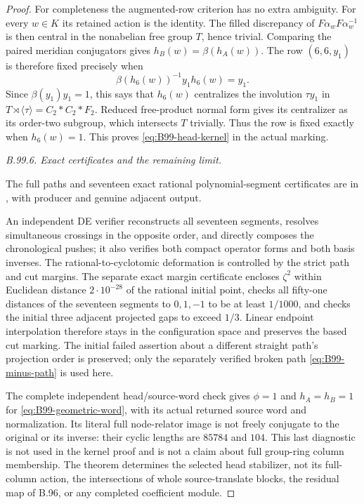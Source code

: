 \begin{proof}
For completeness the augmented-row criterion has no extra ambiguity.
For every $w\in K$ its retained action is the identity.
The filled discrepancy of $F\alpha_wF\alpha_w^{-1}$ is then central
in the nonabelian free group $T$, hence trivial.
Comparing the paired meridian conjugators gives
$h_B(w)=\beta(h_A(w))$.
The row $(6,6,y_1)$ is therefore fixed precisely when
\[
 \beta(h_6(w))^{-1}y_1h_6(w)=y_1.
\]
Since $\beta(y_1)y_1=1$, this says that $h_6(w)$ centralizes the
involution $\tau y_1$ in
$T\rtimes\langle\tau\rangle=C_2*C_2*F_2$.
Reduced free-product normal form gives its centralizer as its
order-two subgroup, which intersects $T$ trivially.
Thus the row is fixed exactly when $h_6(w)=1$.
This proves \eqref{eq:B99-head-kernel} in the actual marking.

\emph{B.99.6. Exact certificates and the remaining limit.}
{\raggedright
The full paths and seventeen exact rational polynomial-segment
certificates are in
,
with producer
and genuine adjacent output.\par}
An independent DE verifier reconstructs all seventeen segments,
resolves simultaneous crossings in the opposite order, and directly
composes the chronological pushes; it also verifies both compact
operator forms and both basis inverses.
The rational-to-cyclotomic deformation is controlled by the strict
path and cut margins.  The separate exact margin certificate encloses
$\zeta^2$ within Euclidean distance $2\cdot10^{-28}$ of the rational
initial point, checks all fifty-one distances of the seventeen
segments to $0,1,-1$ to be at least $1/1000$, and checks the initial
three adjacent projected gaps to exceed $1/3$.
Linear endpoint interpolation therefore stays in the configuration
space and preserves the based cut marking.
The initial failed assertion about a different straight path's
projection order is preserved; only the separately verified broken
path \eqref{eq:B99-minus-path} is used here.

The complete independent head/source-word check gives $\phi=1$ and
$h_A=h_B=1$ for \eqref{eq:B99-geometric-word}, with its actual
returned source word and normalization.
Its literal full node-relator image is not freely conjugate to the
original or its inverse: their cyclic lengths are $85784$ and $104$.
This last diagnostic is not used in the kernel proof and is not a
claim about full group-ring column membership.
The theorem determines the selected head stabilizer, not its
full-column action, the intersections of whole source-translate
blocks, the residual map of B.96, or any completed coefficient module.
\end{proof}
